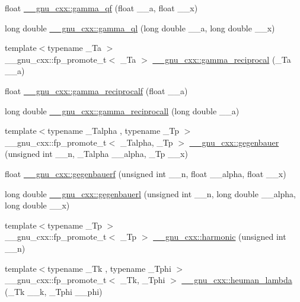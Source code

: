 \begin{DoxyCompactItemize}
float \hyperlink{group__gnu__math__spec__func_ga3ee8d2c40b904952538709cbb0e664a4}{\+\_\+\+\_\+gnu\+\_\+cxx\+::gamma\+\_\+qf} (float \+\_\+\+\_\+a, float \+\_\+\+\_\+x)
\item 
long double \hyperlink{group__gnu__math__spec__func_ga5364a098596681809294d25741539ffc}{\+\_\+\+\_\+gnu\+\_\+cxx\+::gamma\+\_\+ql} (long double \+\_\+\+\_\+a, long double \+\_\+\+\_\+x)
\item 
{\footnotesize template$<$typename \+\_\+\+Ta $>$ }\\\+\_\+\+\_\+gnu\+\_\+cxx\+::fp\+\_\+promote\+\_\+t$<$ \+\_\+\+Ta $>$ \hyperlink{group__gnu__math__spec__func_ga641f9bcdb8fc32a9a0ce7a15b5040076}{\+\_\+\+\_\+gnu\+\_\+cxx\+::gamma\+\_\+reciprocal} (\+\_\+\+Ta \+\_\+\+\_\+a)
\item 
float \hyperlink{group__gnu__math__spec__func_ga10cccd5045490ac24590c094c43107d8}{\+\_\+\+\_\+gnu\+\_\+cxx\+::gamma\+\_\+reciprocalf} (float \+\_\+\+\_\+a)
\item 
long double \hyperlink{group__gnu__math__spec__func_ga73bfcace13daa8b50e7e7e3f583a2eb0}{\+\_\+\+\_\+gnu\+\_\+cxx\+::gamma\+\_\+reciprocall} (long double \+\_\+\+\_\+a)
\item 
{\footnotesize template$<$typename \+\_\+\+Talpha , typename \+\_\+\+Tp $>$ }\\\+\_\+\+\_\+gnu\+\_\+cxx\+::fp\+\_\+promote\+\_\+t$<$ \+\_\+\+Talpha, \+\_\+\+Tp $>$ \hyperlink{group__gnu__math__spec__func_ga173ae710f76407f5997a4caa5c3c060e}{\+\_\+\+\_\+gnu\+\_\+cxx\+::gegenbauer} (unsigned int \+\_\+\+\_\+n, \+\_\+\+Talpha \+\_\+\+\_\+alpha, \+\_\+\+Tp \+\_\+\+\_\+x)
\item 
float \hyperlink{group__gnu__math__spec__func_ga0f16dd9c771c8c177f377381b6e3387c}{\+\_\+\+\_\+gnu\+\_\+cxx\+::gegenbauerf} (unsigned int \+\_\+\+\_\+n, float \+\_\+\+\_\+alpha, float \+\_\+\+\_\+x)
\item 
long double \hyperlink{group__gnu__math__spec__func_gabf1644841deefbb162ade9fa508591cb}{\+\_\+\+\_\+gnu\+\_\+cxx\+::gegenbauerl} (unsigned int \+\_\+\+\_\+n, long double \+\_\+\+\_\+alpha, long double \+\_\+\+\_\+x)
\item 
{\footnotesize template$<$typename \+\_\+\+Tp $>$ }\\\+\_\+\+\_\+gnu\+\_\+cxx\+::fp\+\_\+promote\+\_\+t$<$ \+\_\+\+Tp $>$ \hyperlink{group__gnu__math__spec__func_gab052b72af9c7ec030bcea81965390614}{\+\_\+\+\_\+gnu\+\_\+cxx\+::harmonic} (unsigned int \+\_\+\+\_\+n)
\item 
{\footnotesize template$<$typename \+\_\+\+Tk , typename \+\_\+\+Tphi $>$ }\\\+\_\+\+\_\+gnu\+\_\+cxx\+::fp\+\_\+promote\+\_\+t$<$ \+\_\+\+Tk, \+\_\+\+Tphi $>$ \hyperlink{group__gnu__math__spec__func_ga7537f96eedc8571ed1987481b2863e89}{\+\_\+\+\_\+gnu\+\_\+cxx\+::heuman\+\_\+lambda} (\+\_\+\+Tk \+\_\+\+\_\+k, \+\_\+\+Tphi \+\_\+\+\_\+phi)

\end{DoxyCompactItemize}
